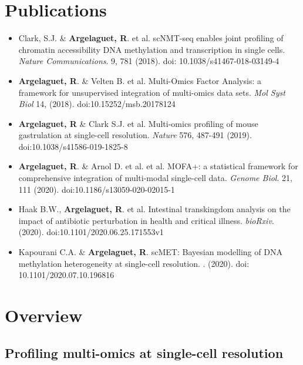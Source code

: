 
\chapter{Publications}

\begin{itemize}
	\item Clark, S.J. \& \textbf{Argelaguet, R}. et al. scNMT-seq enables joint profiling of chromatin accessibility DNA methylation and transcription in single cells. \textit{Nature Communications}. 9, 781 (2018). doi: 10.1038/s41467-018-03149-4
	\item \textbf{Argelaguet, R}. \& Velten B. et al. Multi-Omics Factor Analysis: a framework for unsupervised integration of multi-omics data sets. \textit{Mol Syst Biol} 14, (2018). doi:10.15252/msb.20178124
	\item \textbf{Argelaguet, R} \& Clark S.J. et al. Multi-omics profiling of mouse gastrulation at single-cell resolution. \textit{Nature} 576, 487-491 (2019). doi:10.1038/s41586-019-1825-8
	\item \textbf{Argelaguet, R}. \& Arnol D. et al. et al. MOFA+: a statistical framework for comprehensive integration of multi-modal single-cell data. \textit{Genome Biol}. 21, 111 (2020). doi:10.1186/s13059-020-02015-1
	\item Haak B.W., \textbf{Argelaguet, R}. et al. Intestinal transkingdom analysis on the impact of antibiotic perturbation in health and critical illness. \textit{bioRxiv}. (2020). doi:10.1101/2020.06.25.171553v1
	\item Kapourani C.A. & \textbf{Argelaguet, R}. scMET: Bayesian modelling of DNA methylation heterogeneity at single-cell resolution. . (2020). doi: 10.1101/2020.07.10.196816
\end{itemize}


\chapter{Overview}

\section{Profiling multi-omics at single-cell resolution}

